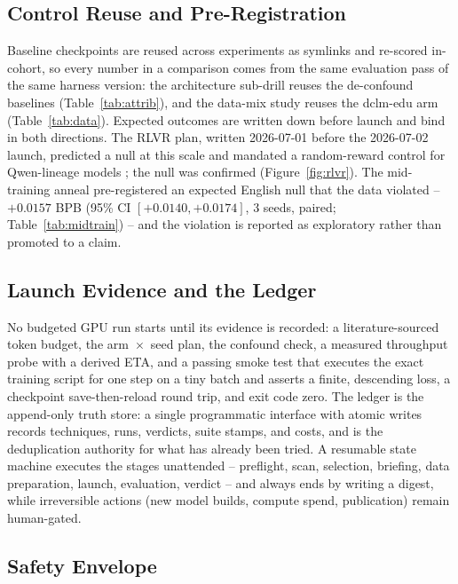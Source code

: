 \subsection{Control Reuse and Pre-Registration}

Baseline checkpoints are reused across experiments as symlinks and re-scored
in-cohort, so every number in a comparison comes from the same evaluation pass
of the same harness version: the architecture sub-drill reuses the de-confound
baselines (Table~\ref{tab:attrib}), and the data-mix study reuses the dclm-edu
arm (Table~\ref{tab:data}). Expected outcomes are written down before launch
and bind in both directions. The RLVR plan, written 2026-07-01 before the
2026-07-02 launch, predicted a null at this scale
\citep{yue2025does} and mandated a random-reward control for Qwen-lineage
models \citep{shao2025spurious}; the null was confirmed
(Figure~\ref{fig:rlvr}). The mid-training anneal pre-registered an expected
English null that the data violated -- $+0.0157$ BPB (95\% CI
$[+0.0140, +0.0174]$, 3 seeds, paired; Table~\ref{tab:midtrain}) -- and the
violation is reported as exploratory rather than promoted to a claim.

\subsection{Launch Evidence and the Ledger}

No budgeted GPU run starts until its evidence is recorded: a literature-sourced
token budget, the arm~$\times$~seed plan, the confound check, a measured
throughput probe with a derived ETA, and a passing smoke test that executes the
exact training script for one step on a tiny batch and asserts a finite,
descending loss, a checkpoint save-then-reload round trip, and exit code zero.
The ledger is the append-only truth store: a single programmatic interface with
atomic writes records techniques, runs, verdicts, suite stamps, and costs, and
is the deduplication authority for what has already been tried. A resumable
state machine executes the stages unattended -- preflight, scan, selection,
briefing, data preparation, launch, evaluation, verdict -- and always ends by
writing a digest, while irreversible actions (new model builds, compute spend,
publication) remain human-gated.

\subsection{Safety Envelope}

